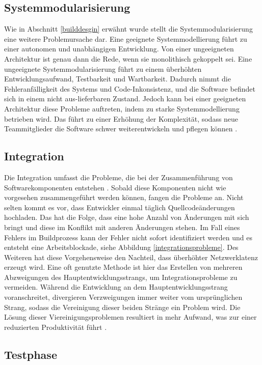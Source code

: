 \subsection{Systemmodularisierung}  \label{Systemmodularisierung}
Wie in Abschnitt \ref{builddesgin} erwähnt wurde stellt die Systemmodularisierung eine weitere Problemursache dar. Eine geeignete Systemmodellierung führt zu einer autonomen und unabhängigen Entwicklung. Von einer ungeeigneten Architektur ist genau dann die Rede, wenn sie monolithisch gekoppelt sei. Eine ungeeignete Systemmodularisierung führt zu einem überhöhten Entwicklungsaufwand, Testbarkeit und Wartbarkeit. Dadurch nimmt die Fehleranfälligkeit des Systems und Code-Inkonsistenz, und die Software befindet sich in einem nicht aus-lieferbaren Zustand. Jedoch kann bei einer geeigneten Architektur diese Probleme auftreten, indem zu starke Systemmodellierung betrieben wird. Das führt zu einer Erhöhung der Komplexität, sodass neue Teammitglieder die Software schwer weiterentwickeln und pflegen können \cite{Laukkanen.2017}. 

\subsection{Integration} \label{Integration}
Die Integration umfasst die Probleme, die bei der Zusammenführung von Softwarekomponenten entstehen \cite{LianpingEtPaddy.2015}. Sobald diese Komponenten nicht wie vorgesehen zusammengeführt werden können, fangen die Probleme an. Nicht selten kommt es vor, dass Entwickler einmal täglich Quellcodeänderungen hochladen. Das hat die Folge, dass eine hohe Anzahl von Änderungen mit sich bringt und diese im Konflikt mit anderen Änderungen stehen. Im Fall eines Fehlers im Buildprozess kann der Fehler nicht sofort identifiziert werden und es entsteht eine Arbeitsblockade, siehe Abbildung \ref{integrationsprobleme}. Des Weiteren hat diese Vorgehensweise den Nachteil, dass überhöhter Netzwerklatenz erzeugt wird. Eine oft genutzte Methode ist hier das Erstellen von mehreren Abzweigungen des Hauptentwicklungsstrangs, um Integrationsprobleme zu vermeiden. Während die Entwicklung an dem Hauptentwicklungsstrang voranschreitet, divergieren Verzweigungen immer weiter vom ursprünglichen Strang, sodass die Vereinigung dieser beiden Stränge ein Problem wird. Die Lösung dieser Viereinigungsproblemen resultiert in mehr Aufwand, was zur einer reduzierten Produktivität führt \cite{Laukkanen.2017}. 

\subsection{Testphase}

